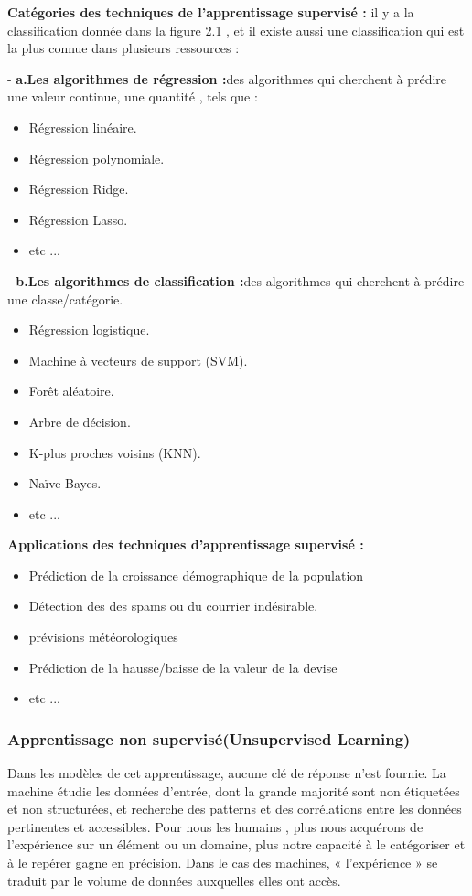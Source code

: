  
\textbf{Catégories des techniques de l'apprentissage supervisé :} il y a la classification donnée dans la figure 2.1 , et il existe aussi une classification qui est la plus connue dans plusieurs ressources : 

-\textbf{   a.Les algorithmes de régression :}des algorithmes qui cherchent à prédire une valeur continue, une quantité , tels que :
\begin{itemize}[label=$\bullet$]
\item Régression linéaire.
\item Régression polynomiale.
\item Régression Ridge.
\item Régression Lasso.
\item etc ...
\end{itemize}

-\textbf{   b.Les algorithmes de classification :}des algorithmes qui cherchent à prédire une classe/catégorie.
\begin{itemize}[label=$\bullet$]
\item Régression logistique.
\item Machine à vecteurs de support (SVM).
\item Forêt aléatoire.
\item Arbre de décision.
\item K-plus proches voisins (KNN).
\item Naïve Bayes.
\item etc ...
\end{itemize}

\textbf{Applications des techniques d'apprentissage supervisé :}
\begin{itemize}[label={*}]
\item Prédiction de la croissance démographique de la population
\item Détection des des spams ou du courrier indésirable.
\item prévisions météorologiques
\item Prédiction de la hausse/baisse de la valeur de la devise
\item etc ...
\end{itemize}

\vspace{2cm}

\subsubsection{Apprentissage non supervisé(Unsupervised Learning)}
Dans les modèles de cet apprentissage, aucune clé de réponse n'est fournie. La machine étudie les données d'entrée, dont la grande majorité sont non étiquetées et non structurées, et recherche des patterns et des corrélations entre les données pertinentes et accessibles.
Pour nous les humains , plus nous acquérons de l'expérience sur un élément ou un domaine, plus notre capacité à le catégoriser et à le repérer gagne en précision. Dans le cas des machines, « l'expérience » se traduit par le volume de données auxquelles elles ont accès\cite{what_is_machine_learning}. 

